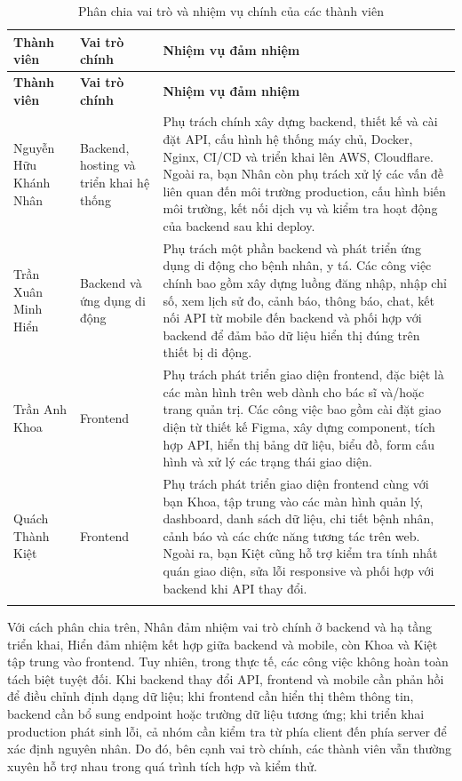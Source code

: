 \begin{center}
\begin{longtable}{|p{3.2cm}|p{4.2cm}|p{6.5cm}|}
    \hline
    \textbf{Thành viên} & \textbf{Vai trò chính} & \textbf{Nhiệm vụ đảm nhiệm} \\
    \hline
    \endfirsthead
    \hline
    \textbf{Thành viên} & \textbf{Vai trò chính} & \textbf{Nhiệm vụ đảm nhiệm} \\
    \hline
    \endhead

    Nguyễn Hữu Khánh Nhân &
    Backend, hosting và triển khai hệ thống &
    Phụ trách chính xây dựng backend, thiết kế và cài đặt API, cấu hình hệ thống máy chủ, Docker, Nginx, CI/CD và triển khai lên AWS, Cloudflare. Ngoài ra, bạn Nhân còn phụ trách xử lý các vấn đề liên quan đến môi trường production, cấu hình biến môi trường, kết nối dịch vụ và kiểm tra hoạt động của backend sau khi deploy. \\
    \hline

    Trần Xuân Minh Hiển &
    Backend và ứng dụng di động &
    Phụ trách một phần backend và phát triển ứng dụng di động cho bệnh nhân, y tá. Các công việc chính bao gồm xây dựng luồng đăng nhập, nhập chỉ số, xem lịch sử đo, cảnh báo, thông báo, chat, kết nối API từ mobile đến backend và phối hợp với backend để đảm bảo dữ liệu hiển thị đúng trên thiết bị di động. \\
    \hline

    Trần Anh Khoa &
    Frontend &
    Phụ trách phát triển giao diện frontend, đặc biệt là các màn hình trên web dành cho bác sĩ và/hoặc trang quản trị. Các công việc bao gồm cài đặt giao diện từ thiết kế Figma, xây dựng component, tích hợp API, hiển thị bảng dữ liệu, biểu đồ, form cấu hình và xử lý các trạng thái giao diện. \\
    \hline

    Quách Thành Kiệt &
    Frontend &
    Phụ trách phát triển giao diện frontend cùng với bạn Khoa, tập trung vào các màn hình quản lý, dashboard, danh sách dữ liệu, chi tiết bệnh nhân, cảnh báo và các chức năng tương tác trên web. Ngoài ra, bạn Kiệt cũng hỗ trợ kiểm tra tính nhất quán giao diện, sửa lỗi responsive và phối hợp với backend khi API thay đổi. \\
    \hline

    \caption{Phân chia vai trò và nhiệm vụ chính của các thành viên}
    \label{chapter4-table01}
\end{longtable}
\end{center}

\par Với cách phân chia trên, Nhân đảm nhiệm vai trò chính ở backend và hạ tầng triển khai, Hiển đảm nhiệm kết hợp giữa backend và mobile, còn Khoa và Kiệt tập trung vào frontend. Tuy nhiên, trong thực tế, các công việc không hoàn toàn tách biệt tuyệt đối. Khi backend thay đổi API, frontend và mobile cần phản hồi để điều chỉnh định dạng dữ liệu; khi frontend cần hiển thị thêm thông tin, backend cần bổ sung endpoint hoặc trường dữ liệu tương ứng; khi triển khai production phát sinh lỗi, cả nhóm cần kiểm tra từ phía client đến phía server để xác định nguyên nhân. Do đó, bên cạnh vai trò chính, các thành viên vẫn thường xuyên hỗ trợ nhau trong quá trình tích hợp và kiểm thử.

